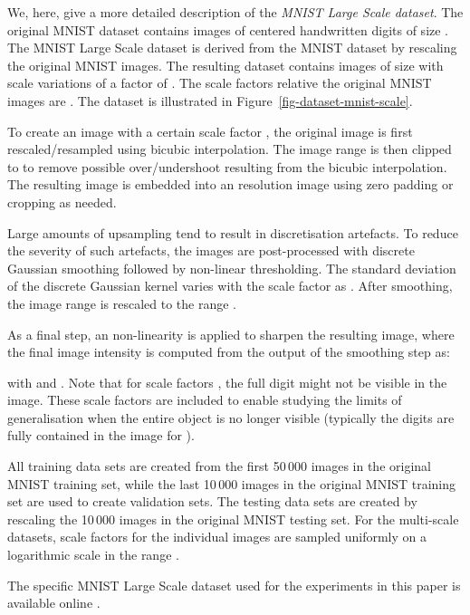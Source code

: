 \documentclass[twocolumn,runningheads]{svjour3}
\begin{document}
We, here, give a more detailed description of the {\em MNIST Large Scale dataset\/}. 
The original MNIST dataset \cite{LecBotBenHaf98-ProcIEEE} contains images
of centered handwritten digits of size . 
The MNIST Large Scale dataset is derived from the MNIST dataset by
rescaling the original MNIST images. 
The resulting dataset contains images of size  with
scale variations of a factor of . 
The scale factors  relative the original MNIST images are . 
The dataset is illustrated in Figure~\ref{fig-dataset-mnist-scale}.
	
To create an image with a certain scale factor , the original image
is first rescaled/resampled using bicubic interpolation. The image
range is then clipped to  to remove possible over/undershoot
resulting from the bicubic interpolation. The resulting image is
embedded into an  resolution image using zero padding
or cropping as needed. 
	
Large amounts of upsampling tend to result in discretisation
artefacts. To reduce the severity of such artefacts, the images are
post-processed with discrete Gaussian smoothing \cite{Lin90-PAMI}
followed by non-linear thresholding. The standard deviation of the
discrete Gaussian kernel varies with the scale factor as . After smoothing, the image range is rescaled to the
range .
	
As a final step, an  non-linearity is applied to sharpen the
resulting image, where the final image intensity  is computed
from the output of the smoothing step  as:  
	
with   and . 
Note that for scale factors , the full digit might not be visible
in the image. These scale factors are included to enable studying the
limits of generalisation when the entire object is no longer visible
(typically the digits are fully contained in the image for ).
	
All training data sets are created from the first 50\,000 images in
the original MNIST training set, while the last 10\,000 images in the
original MNIST training set are used to create validation sets. The
testing data sets are created by rescaling the 10\,000 images in the
original MNIST testing set. For the multi-scale datasets, scale factors
for the individual images are sampled uniformly on a logarithmic scale
in the range .
	
The specific MNIST Large Scale dataset used for the experiments in this paper is
available online \cite{JanLin20-MNISTLargeScale}.	
	


\end{document}
